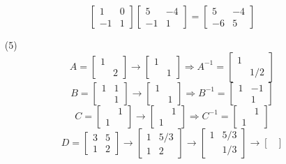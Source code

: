 \documentclass[openany]{book}
\begin{document}
\begin{itemize}
$$\begin{bmatrix}
1 & 0 \\
-1 & 1
\end{bmatrix}\begin{bmatrix}
5 & -4 \\
-1 & 1
\end{bmatrix} = \begin{bmatrix}
5 & -4 \\
-6 & 5
\end{bmatrix}$$
\item[(5)]
$$A = \begin{bmatrix}
1 & \\
& 2
\end{bmatrix} \rightarrow \begin{bmatrix}
1 & \\
& 1
\end{bmatrix} \Rightarrow A^{-1} = \begin{bmatrix}
1 & \\
& 1/2
\end{bmatrix} $$
$$B = \begin{bmatrix}
1 & 1 \\
& 1
\end{bmatrix} \rightarrow \begin{bmatrix}
1 & \\
& 1
\end{bmatrix} \Rightarrow B^{-1} = \begin{bmatrix}
1 & -1 \\
& 1
\end{bmatrix}$$
$$C = \begin{bmatrix}
& 1 \\
1 &
\end{bmatrix} \rightarrow \begin{bmatrix}
& 1 \\
1 &
\end{bmatrix} \Rightarrow C^{-1} = \begin{bmatrix}
& 1 \\
1 &
\end{bmatrix}$$
$$D = \begin{bmatrix}
3 & 5 \\
1 & 2
\end{bmatrix} \rightarrow \begin{bmatrix}
1 & 5/3 \\
1 & 2
\end{bmatrix} \rightarrow \begin{bmatrix}
1 & 5/3 \\
& 1/3
\end{bmatrix} \rightarrow \begin{bmatrix}

\end{bmatrix}$$
\end{itemize}
\end{document}
